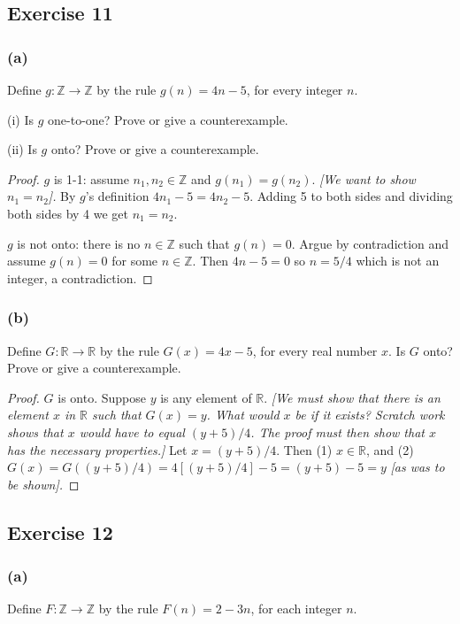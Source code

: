 \documentclass[14pt]{extarticle}
\newcommand{\R}{\mathbb{R}}
\newcommand{\Z}{\mathbb{Z}}
\begin{document}
\subsection{Exercise 11}
\subsubsection{(a)}
Define \(g: \Z \to \Z\) by the rule \(g(n) = 4n - 5\), for every integer $n$.

(i) Is $g$ one-to-one? Prove or give a counterexample.

(ii) Is $g$ onto? Prove or give a counterexample.

\begin{proof}
    $g$ is 1-1: assume \(n_1, n_2 \in \Z\) and \(g(n_1) = g(n_2)\). {\it [We want to show \(n_1 = n_2\)].} By $g$'s
    definition \(4n_1-5=4n_2-5\). Adding 5 to both sides and dividing both sides by 4 we get \(n_1 = n_2\).

    $g$ is not onto: there is no $n \in \Z$ such that $g(n) = 0$. Argue by contradiction and assume \(g(n) = 0\) for some
    \(n \in \Z\). Then \(4n-5 = 0\) so \(n = 5/4\) which is not an integer, a contradiction.
\end{proof}

\subsubsection{(b)}
Define \(G: \R \to \R\) by the rule \(G(x) = 4x - 5\), for every real number $x$. Is $G$ onto? Prove or give a counterexample.

\begin{proof}
    $G$ is onto. Suppose $y$ is any element of $\R$. {\it [We must show that there is an element $x$ in $\R$ such that
                \(G(x) = y\). What would $x$ be if it exists? Scratch work shows that $x$ would have to equal \((y + 5)/4\). The proof
                must then show that $x$ has the necessary properties.]} Let \(x = (y + 5)/4\). Then (1) \(x \in \R\), and (2) \(G(x) =
    G((y + 5)/4) = 4[(y + 5)/4] - 5 = (y + 5) - 5 = y\) {\it [as was to be shown].}
\end{proof}

\subsection{Exercise 12}
\subsubsection{(a)}
Define \(F: \Z \to \Z\) by the rule \(F(n) = 2 - 3n\), for each integer $n$.
\end{document}
